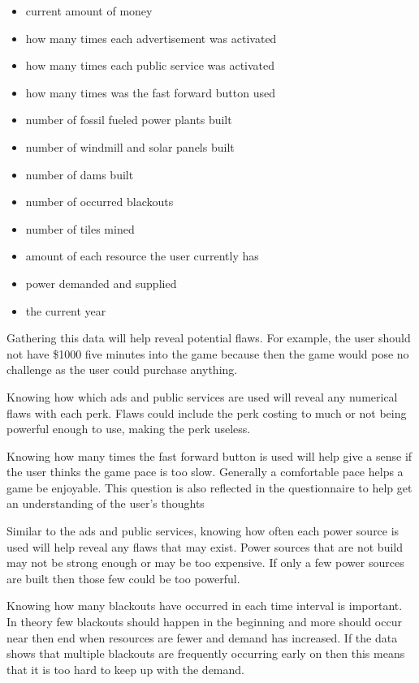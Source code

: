 \documentclass[msc,oneside]{ubcthesis}%
\begin{document}
  \begin{itemize}
  \item current amount of money
  \item how many times each advertisement was activated
  \item how many times each public service was activated
  \item how many times was the fast forward button used
  \item number of fossil fueled power plants built
  \item number of windmill and solar panels built
  \item number of dams built
  \item number of occurred blackouts
  \item number of tiles mined
  \item amount of each resource the user currently has 
  \item power demanded and supplied
  \item the current year
\end{itemize}

  Gathering this data will help reveal potential flaws. For example, the user should not have \$1000 five minutes into the game because then the game would pose no challenge as the user could purchase anything.

  Knowing how which ads and public services are used will reveal any numerical flaws with each perk. Flaws could include the perk costing to much or not being powerful enough to use, making the perk useless.

  Knowing how many times the fast forward button is used will help give a sense if the user thinks the game pace is too slow. Generally a comfortable pace helps a game be enjoyable. This question is also reflected in the questionnaire to help get an understanding of the user's thoughts


  Similar to the ads and public services, knowing how often each power source is used will help reveal any flaws that may exist. Power sources that are not build may not be strong enough or may be too expensive. If only a few power sources are built then those few could be too powerful.

  Knowing how many blackouts have occurred in each time interval is important. In theory few blackouts should happen in the beginning and more should occur near then end when resources are fewer and demand has increased. If the data shows that multiple blackouts are frequently occurring early on then this means that it is too hard to keep up with the demand. 
\end{document}
